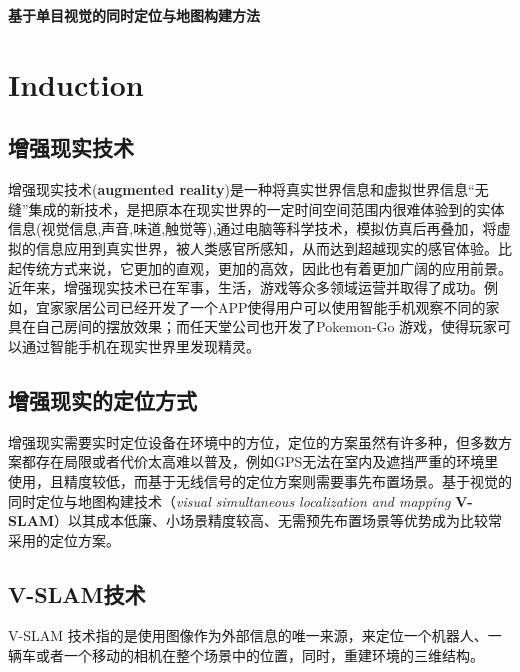 \documentclass[14pt]{article}
\begin{document}
\begin{center}
\textbf{基于单目视觉的同时定位与地图构建方法}
\end{center}
\author{吴\ 王\ 朱}
\section{Induction}
\subsection{增强现实技术}
增强现实技术(\textbf{augmented reality})是一种将真实世界信息和虚拟世界信息“无缝”集成的新技术，是把原本在现实世界的一定时间空间范围内很难体验到的实体信息(视觉信息,声音,味道,触觉等),通过电脑等科学技术，模拟仿真后再叠加，将虚拟的信息应用到真实世界，被人类感官所感知，从而达到超越现实的感官体验。比起传统方式来说，它更加的直观，更加的高效，因此也有着更加广阔的应用前景。近年来，增强现实技术已在军事，生活，游戏等众多领域运营并取得了成功。例如，宜家家居公司已经开发了一个APP使得用户可以使用智能手机观察不同的家具在自己房间的摆放效果；而任天堂公司也开发了Pokemon-Go 游戏，使得玩家可以通过智能手机在现实世界里发现精灵。

\subsection{增强现实的定位方式}
增强现实需要实时定位设备在环境中的方位，定位的方案虽然有许多种，但多数方案都存在局限或者代价太高难以普及，例如GPS无法在室内及遮挡严重的环境里使用，且精度较低，而基于无线信号的定位方案则需要事先布置场景。基于视觉的同时定位与地图构建技术（\textit{visual simultaneous localization and mapping} \textbf{V-SLAM}）以其成本低廉、小场景精度较高、无需预先布置场景等优势成为比较常采用的定位方案。

\subsection{V-SLAM技术}
V-SLAM 技术指的是使用图像作为外部信息的唯一来源，来定位一个机器人、一辆车或者一个移动的相机在整个场景中的位置，同时，重建环境的三维结构。
\end{document}
